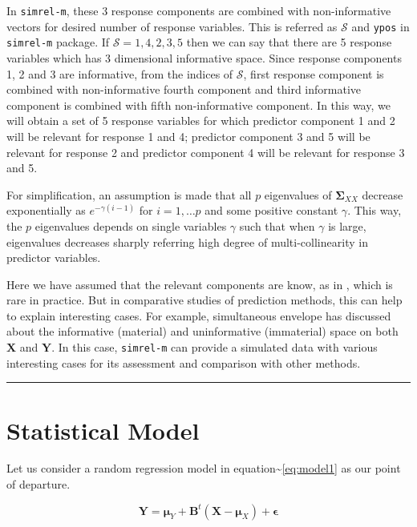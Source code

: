 \documentclass[12pt,A4paper,authoryear]{elsarticle} %
\begin{document}
In \texttt{simrel-m}, these 3 response components are combined with
non-informative vectors for desired number of response variables. This
is referred as \(\mathcal{S}\) and \texttt{ypos} in \texttt{simrel-m}
package. If \(\mathcal{S} = {{1, 4}, {2}, {3, 5}}\) then we can say that
there are 5 response variables which has 3 dimensional informative
space. Since response components 1, 2 and 3 are informative, from the
indices of \(\mathcal{S}\), first response component is combined with
non-informative fourth component and third informative component is
combined with fifth non-informative component. In this way, we will
obtain a set of 5 response variables for which predictor component 1 and
2 will be relevant for response 1 and 4; predictor component 3 and 5
will be relevant for response 2 and predictor component 4 will be
relevant for response 3 and 5.

For simplification, an assumption is made that all \(p\) eigenvalues of
\(\boldsymbol{\Sigma}_{XX}\) decrease exponentially as
\(e^{-\gamma (i - 1)}\) for \(i = 1, \ldots p\) and some positive
constant \(\gamma\). This way, the \(p\) eigenvalues depends on single
variables \(\gamma\) such that when \(\gamma\) is large, eigenvalues
decreases sharply referring high degree of multi-collinearity in
predictor variables.

Here we have assumed that the relevant components are know, as in
\citet{helland1994comparison}, which is rare in practice. But in
comparative studies of prediction methods, this can help to explain
interesting cases. For example, simultaneous envelope
\citep{cook2015simultaneous} has discussed about the informative
(material) and uninformative (immaterial) space on both \(\mathbf{X}\)
and \(\mathbf{Y}\). In this case, \texttt{simrel-m} can provide a
simulated data with various interesting cases for its assessment and
comparison with other methods.

\begin{center}\rule{0.5\linewidth}{\linethickness}\end{center}

\section{Statistical Model}\label{statistical-model}

Let us consider a random regression model in
equation\textasciitilde{}\eqref{eq:model1} as our point of departure.

\begin{equation}
  \mathbf{Y} = \boldsymbol{\mu}_Y + \mathbf{B}^t (\mathbf{X} - \boldsymbol{\mu}_X) + \boldsymbol{\epsilon}
  \label{eq:model1}
\end{equation}
\end{document}
